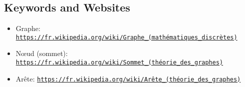 \documentclass[a4paper,11pt]{report}
\newcommand{\BrochureUrlText}[1]{\texttt{#1}}
\begin{document}
{\raggedright

\subsection*{Keywords and Websites}

\begin{itemize}
  \item Graphe: \href{https://fr.wikipedia.org/wiki/Graphe_(math\%C3\%A9matiques_discr\%C3\%A8tes)}{\BrochureUrlText{https://fr.wikipedia.org/wiki/Graphe\_(mathématiques\_discrètes)}}
  \item Nœud (sommet): \href{https://fr.wikipedia.org/wiki/Sommet_(th\%C3\%A9orie_des_graphes)}{\BrochureUrlText{https://fr.wikipedia.org/wiki/Sommet\_(théorie\_des\_graphes)}}
  \item Arête: \href{https://fr.wikipedia.org/wiki/Ar\%C3\%AAte_(th\%C3\%A9orie_des_graphes)}{\BrochureUrlText{https://fr.wikipedia.org/wiki/Arête\_(théorie\_des\_graphes)}}
\end{itemize}


}
\end{document}
